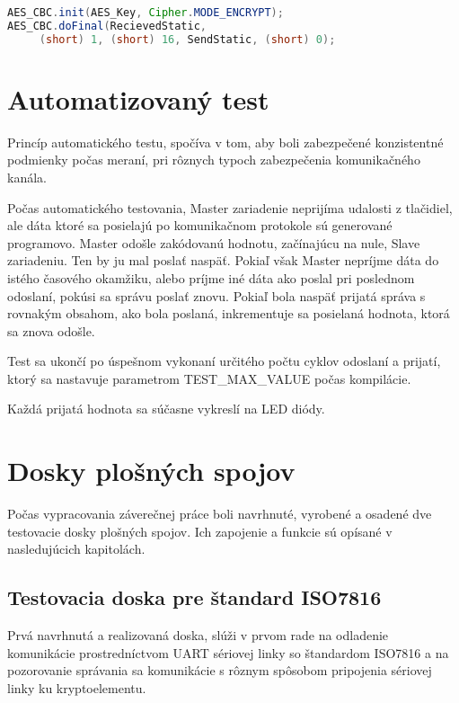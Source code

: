 \documentclass[12pt,a4paper,oneside,openright]{report}
\begin{document}
	\begin{lstlisting}[caption={Zavolanie metódy HW kryptovania.}, label={lst:hwuse}, language=java] 
AES_CBC.init(AES_Key, Cipher.MODE_ENCRYPT);
AES_CBC.doFinal(RecievedStatic,
	 (short) 1, (short) 16, SendStatic, (short) 0);
	\end{lstlisting}
	

\section{Automatizovaný test}
Princíp automatického testu, spočíva v tom, aby boli zabezpečené konzistentné podmienky počas meraní, pri rôznych typoch zabezpečenia komunikačného kanála.

Počas automatického testovania, Master zariadenie neprijíma udalosti z tlačidiel, ale dáta ktoré sa posielajú po komunikačnom protokole sú generované programovo. Master odošle zakódovanú hodnotu, začínajúcu na nule, Slave zariadeniu. Ten by ju mal poslať naspäť. Pokiaľ však Master nepríjme dáta do istého časového okamžiku, alebo príjme iné dáta ako poslal pri poslednom odoslaní, pokúsi sa správu poslať znovu. Pokiaľ bola naspäť prijatá správa s rovnakým obsahom, ako bola poslaná, inkrementuje sa posielaná hodnota, ktorá sa znova odošle.

Test sa ukončí po úspešnom vykonaní určitého počtu cyklov odoslaní a prijatí, ktorý sa nastavuje parametrom TEST\_MAX\_VALUE počas kompilácie.

Každá prijatá hodnota sa súčasne vykreslí na LED diódy.


\newpage

\section{Dosky plošných spojov}
Počas vypracovania záverečnej práce boli navrhnuté, vyrobené a osadené dve testovacie dosky plošných spojov. Ich zapojenie a funkcie sú opísané v nasledujúcich kapitolách.

	\subsection{Testovacia doska pre štandard ISO7816} \label{isoboard}
	
	Prvá navrhnutá a realizovaná doska, slúži v prvom rade na odladenie komunikácie prostredníctvom UART sériovej linky so štandardom ISO7816 a na pozorovanie správania sa komunikácie s rôznym spôsobom pripojenia sériovej linky ku kryptoelementu.
	
\end{document}
